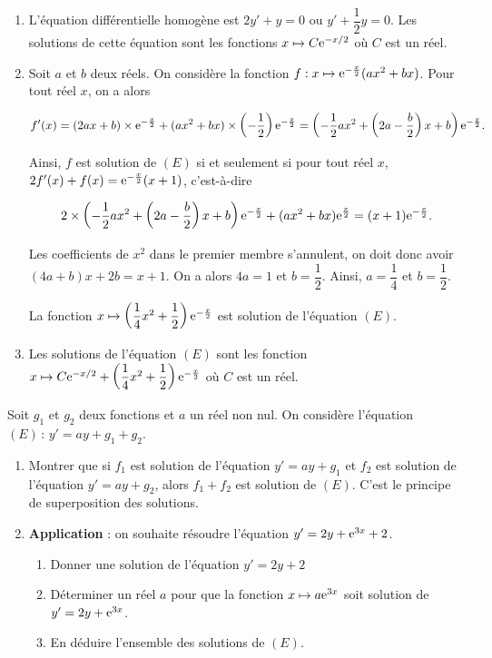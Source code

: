 \documentclass[11pt,fleqn, openany]{book} %
\begin{document}
\begin{solution}\hspace{0pt}

\begin{enumerate}\item  L'équation différentielle homogène est \(2y'+y=0\) ou \(y'+\dfrac{1}{2}y=0\). Les solutions de cette équation sont les fonctions \(x\mapsto C\mathrm{e}^{-x/2}\) où \(C\) est un réel.
\item Soit \(a\) et \(b\) deux réels. On considère la fonction \(f:x\mapsto \mathrm{e}^{-\frac{x}{2}}(ax^2+bx)\). Pour tout réel \(x\), on a alors

\[f'(x)=(2ax+b) \times \mathrm{e}^{-\frac{x}{2}}+(ax^2+bx) \times \left(-\dfrac{1}{2}\right)\mathrm{e}^{-\frac{x}{2}}=\left(-\dfrac{1}{2} ax^2+\left(2a-\dfrac{b}{2}\right)x+b\right)\mathrm{e}^{-\frac{x}{2}}.\]

Ainsi, \(f\) est solution de \((E)\) si et seulement si pour tout réel \(x\), \(2f'(x)+f(x)=\mathrm{e}^{-\frac{x}{2}}(x+1)\), c'est-à-dire

\[2 \times \left(-\dfrac{1}{2} ax^2+\left(2a-\dfrac{b}{2}\right)x+b\right)\mathrm{e}^{-\frac{x}{2}} + (ax^2+bx)\mathrm{e}^{\frac{x}{2}}=(x+1)\mathrm{e}^{-\frac{x}{2}}.\]

Les coefficients de \(x^2\) dans le premier membre s'annulent, on doit donc avoir \(\left(4a+b\right)x+2b=x+1\). On a alors \(4a=1\) et \(b=\dfrac{1}{2}\). Ainsi, \(a=\dfrac{1}{4}\) et \(b=\dfrac{1}{2}\).

La fonction \(x\mapsto \left(\dfrac{1}{4}x^2+\dfrac{1}{2}\right)\mathrm{e}^{-\frac{x}{2}}\) est solution de l'équation \((E)\).


\item Les solutions de l'équation \((E)\) sont les fonction \(x\mapsto C\mathrm{e}^{-x/2}+\left(\dfrac{1}{4}x^2+\dfrac{1}{2}\right)\mathrm{e}^{-\frac{x}{2}}\) où \(C\) est un réel.\end{enumerate}
  \end{solution}
  
  

\begin{exercise}Soit $g_1$ et $g_2$ deux fonctions et $a$ un réel non nul.
On considère l'équation $(E)\,:\,y'=ay+g_1+g_2$.
\begin{enumerate}
\item Montrer que si $f_1$ est solution de l'équation $y'=ay+g_1$ et $f_2$ est solution de l'équation $y'=ay+g_2$, alors $f_1+f_2$ est solution de $(E)$. C'est le principe de superposition des solutions.
\item \textbf{Application} : on souhaite résoudre l'équation $y'=2y+\mathrm{e}^{3x}+2$.
\begin{enumerate}
\item Donner une solution de l'équation $y'=2y+2$
\item Déterminer un réel $a$ pour que la fonction $x\mapsto a\mathrm{e}^{3x}$ soit solution de $y'=2y+\mathrm{e}^{3x}$.
\item En déduire l'ensemble des solutions de $(E)$.
\end{enumerate}
\end{enumerate}\newpage \end{exercise}
\end{document}
